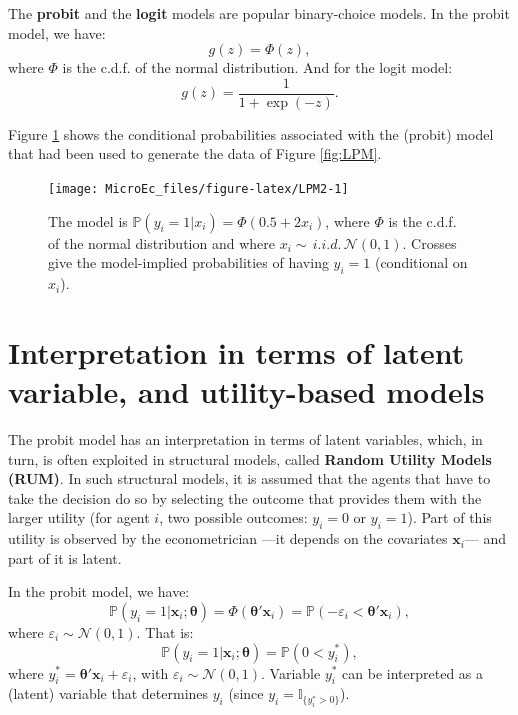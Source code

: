 \documentclass[
  12pt,
]{book}
\theoremstyle{definition}
\theoremstyle{definition}
\theoremstyle{definition}
\theoremstyle{definition}
\theoremstyle{remark}
\begin{document}
The \textbf{probit} and the \textbf{logit} models are popular binary-choice models. In the probit model, we have:
\begin{equation}
g(z) = \Phi(z),\label{eq:probit}
\end{equation}
where \(\Phi\) is the c.d.f. of the normal distribution. And for the logit model:
\begin{equation}
g(z) = \frac{1}{1+\exp(-z)}.\label{eq:logit}
\end{equation}

Figure \ref{fig:LPM2} shows the conditional probabilities associated with the (probit) model that had been used to generate the data of Figure \ref{fig:LPM}.

\begin{figure}
\texttt{[image: MicroEc\_files/figure-latex/LPM2-1]} \caption{The model is $\mathbb{P}(y_i=1|x_i)=\Phi(0.5+2x_i)$, where $\Phi$ is the c.d.f. of the normal distribution and where $x_i \sim \,i.i.d.\,\mathcal{N}(0,1)$. Crosses give the model-implied probabilities of having $y_i=1$ (conditional on $x_i$).}\label{fig:LPM2}
\end{figure}

\hypertarget{latent}{%
\section{Interpretation in terms of latent variable, and utility-based models}\label{latent}}

The probit model has an interpretation in terms of latent variables, which, in turn, is often exploited in structural models, called \textbf{Random Utility Models (RUM)}. In such structural models, it is assumed that the agents that have to take the decision do so by selecting the outcome that provides them with the larger utility (for agent \(i\), two possible outcomes: \(y_i=0\) or \(y_i=1\)). Part of this utility is observed by the econometrician ---it depends on the covariates \(\mathbf{x}_i\)--- and part of it is latent.

In the probit model, we have:
\[
\mathbb{P}(y_i=1|\mathbf{x}_i;\boldsymbol\theta) = \Phi(\boldsymbol\theta'\mathbf{x}_i) = \mathbb{P}(-\varepsilon_{i}<\boldsymbol\theta'\mathbf{x}_i),
\]
where \(\varepsilon_{i} \sim \mathcal{N}(0,1)\). That is:
\[
\mathbb{P}(y_i=1|\mathbf{x}_i;\boldsymbol\theta) = \mathbb{P}(0< y_i^*),
\]
where \(y_i^* = \boldsymbol\theta'\mathbf{x}_i + \varepsilon_i\), with \(\varepsilon_{i} \sim \mathcal{N}(0,1)\). Variable \(y_i^*\) can be interpreted as a (latent) variable that determines \(y_i\) (since \(y_i = \mathbb{I}_{\{y_i^*>0\}}\)).
\end{document}
